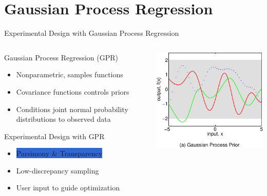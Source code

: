 \documentclass[10pt, compress, aspectratio=169, xcolor={table,usenames,dvipsnames}]{beamer}
\begin{document}
\section{Gaussian Process Regression}
\label{sec:org1906239}
\begin{frame}[label={sec:org0fd5b4a}]{Experimental Design with Gaussian Process Regression}
\begin{columns}
\begin{column}{0.5\columnwidth}
\begin{block}{Gaussian Process Regression (GPR)}
\begin{itemize}
\item \alert{Nonparametric}, samples \alert{functions}
\item \alert{Covariance} functions controls priors
\item \alert{Conditions} joint normal probability distributions to \alert{observed data}
\end{itemize}
\begin{block}{Experimental Design with GPR}
\begin{itemize}
\item \colorbox{Highlight}{\alert{Parsimony} \& \alert{Transparency}}
\item \alert{Low-discrepancy} sampling
\item User input to guide optimization
\end{itemize}
\end{block}
\end{block}
\end{column}
\begin{column}{0.5\columnwidth}
\begin{center}
\includegraphics[width=.99\columnwidth]{../../../img/rasmussen_prior.pdf}
\end{center}

\end{column}
\end{columns}
\end{frame}
\end{document}
